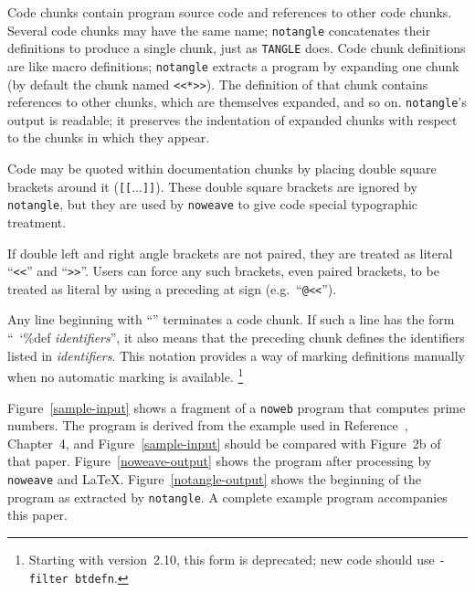 Code chunks contain program source code and references to other code
chunks.  
Several code chunks may have the same name; {\tt notangle}
concatenates their definitions to produce a single chunk, just as
 {\tt TANGLE} does.
Code chunk definitions are like macro definitions;
{\tt notangle} extracts a program by expanding one chunk (by default
the chunk named \verb+<<*>>+).
The definition of that chunk contains references to other chunks,
which are themselves expanded, and so on.
{\tt notangle}'s output is readable; it preserves the indentation of expanded
chunks with respect to the chunks in which they appear.

Code may be quoted within documentation chunks by placing double
square brackets around it ({\tt [[}$\ldots${\tt]]}). 
These double square brackets are ignored by {\tt notangle}, but they
are used by {\tt noweave} to give code special typographic
treatment.

If double left and right angle brackets are not paired, they are
treated as literal ``{\tt<<}'' and ``{\tt>>}''.  Users can force any
such brackets, even paired brackets, to be treated as literal by
using a preceding at sign (e.g.~``{\tt @<<}'').

Any line beginning with ``{\tt@ }'' terminates a code chunk.
If such a line has the form
``{\tt@~\char`\%def {\rm\it identifiers}}'',
it also means that the preceding chunk defines the identifiers listed 
in {\it identifiers}.
This notation provides a way of marking definitions manually when 
no automatic marking is available.%
\footnote{Starting with version~2.10, this form is deprecated; new
code should use \texttt{-filter~btdefn}.}

Figure~\ref{sample-input} shows a fragment of a {\tt noweb} program
that computes prime numbers.
The program is derived from the example used in
Reference~, Chapter~4, and Figure~\ref{sample-input} should
be compared with Figure~2b of that paper.
Figure~\ref{noweave-output} shows the program after processing by {\tt
noweave} and {\LaTeX}.
Figure~\ref{notangle-output} shows the beginning of the program as
extracted by {\tt notangle}.
A complete example program accompanies this paper.

